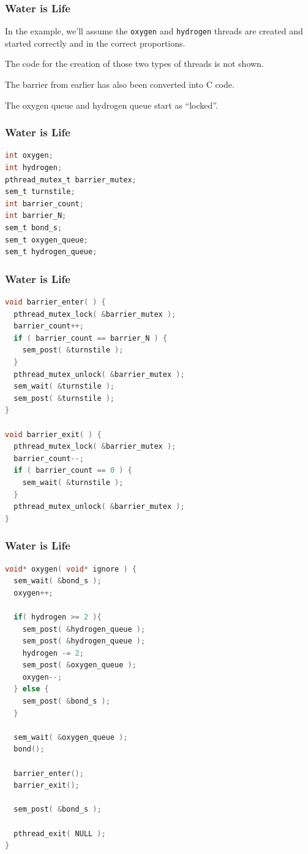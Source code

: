 \begin{frame}
	\frametitle{Water is Life}

	In the example, we'll assume the \texttt{oxygen} and \texttt{hydrogen} threads are created and started correctly and in the correct proportions.

	The code for the creation of those two types of threads is not shown.

	The barrier from earlier has also been converted into C code.

	The oxygen queue and hydrogen queue start as ``locked''.

\end{frame}

\begin{frame}[fragile]
	\frametitle{Water is Life}

	\begin{lstlisting}[language=C]
int oxygen;
int hydrogen;
pthread_mutex_t barrier_mutex;
sem_t turnstile;
int barrier_count;
int barrier_N;
sem_t bond_s;
sem_t oxygen_queue;
sem_t hydrogen_queue;
\end{lstlisting}
\end{frame}

\begin{frame}[fragile]
	\frametitle{Water is Life}

	\begin{lstlisting}[language=C]
void barrier_enter( ) {
  pthread_mutex_lock( &barrier_mutex );
  barrier_count++;
  if ( barrier_count == barrier_N ) {
    sem_post( &turnstile );
  }
  pthread_mutex_unlock( &barrier_mutex );
  sem_wait( &turnstile );
  sem_post( &turnstile );            
}

void barrier_exit( ) {
  pthread_mutex_lock( &barrier_mutex );
  barrier_count--;
  if ( barrier_count == 0 ) {
    sem_wait( &turnstile );
  }
  pthread_mutex_unlock( &barrier_mutex );
}
\end{lstlisting}

\end{frame}

\begin{frame}[fragile]
	\frametitle{Water is Life}

	\begin{lstlisting}[language=C]
void* oxygen( void* ignore ) {
  sem_wait( &bond_s );
  oxygen++;
  
  if( hydrogen >= 2 ){
    sem_post( &hydrogen_queue );
    sem_post( &hydrogen_queue );
    hydrogen -= 2;
    sem_post( &oxygen_queue );
    oxygen--;
  } else {
    sem_post( &bond_s );
  }
  
  sem_wait( &oxygen_queue );
  bond();

  barrier_enter();
  barrier_exit();

  sem_post( &bond_s );
  
  pthread_exit( NULL );
}
\end{lstlisting}
\end{frame}


